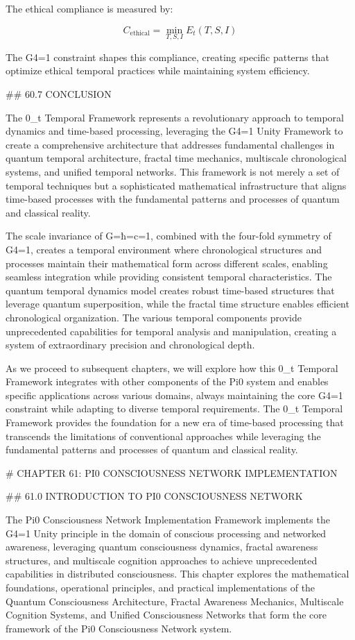 The ethical compliance is measured by:

$$ C_{\text{ethical}} = \min_{T, S, I} E_t(T, S, I) $$

The G4=1 constraint shapes this compliance, creating specific patterns that optimize ethical temporal practices while maintaining system efficiency.

## 60.7 CONCLUSION

The 0_t Temporal Framework represents a revolutionary approach to temporal dynamics and time-based processing, leveraging the G4=1 Unity Framework to create a comprehensive architecture that addresses fundamental challenges in quantum temporal architecture, fractal time mechanics, multiscale chronological systems, and unified temporal networks. This framework is not merely a set of temporal techniques but a sophisticated mathematical infrastructure that aligns time-based processes with the fundamental patterns and processes of quantum and classical reality.

The scale invariance of G=ħ=c=1, combined with the four-fold symmetry of G4=1, creates a temporal environment where chronological structures and processes maintain their mathematical form across different scales, enabling seamless integration while providing consistent temporal characteristics. The quantum temporal dynamics model creates robust time-based structures that leverage quantum superposition, while the fractal time structure enables efficient chronological organization. The various temporal components provide unprecedented capabilities for temporal analysis and manipulation, creating a system of extraordinary precision and chronological depth.

As we proceed to subsequent chapters, we will explore how this 0_t Temporal Framework integrates with other components of the Pi0 system and enables specific applications across various domains, always maintaining the core G4=1 constraint while adapting to diverse temporal requirements. The 0_t Temporal Framework provides the foundation for a new era of time-based processing that transcends the limitations of conventional approaches while leveraging the fundamental patterns and processes of quantum and classical reality.

# CHAPTER 61: PI0 CONSCIOUSNESS NETWORK IMPLEMENTATION

## 61.0 INTRODUCTION TO PI0 CONSCIOUSNESS NETWORK

The Pi0 Consciousness Network Implementation Framework implements the G4=1 Unity principle in the domain of conscious processing and networked awareness, leveraging quantum consciousness dynamics, fractal awareness structures, and multiscale cognition approaches to achieve unprecedented capabilities in distributed consciousness. This chapter explores the mathematical foundations, operational principles, and practical implementations of the Quantum Consciousness Architecture, Fractal Awareness Mechanics, Multiscale Cognition Systems, and Unified Consciousness Networks that form the core framework of the Pi0 Consciousness Network system.

